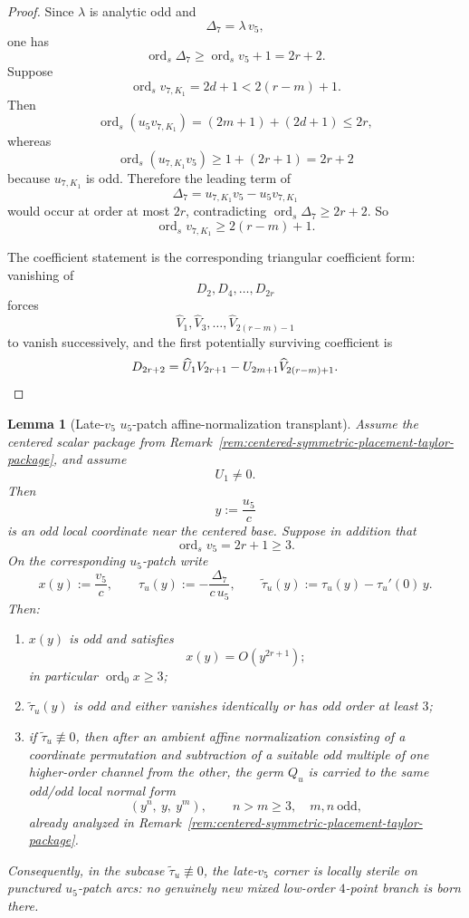 \documentclass[11pt,a4paper]{amsart}
\theoremstyle{plain}
\newtheorem{lemma}[theorem]{Lemma}
\theoremstyle{definition}
\begin{document}
\begin{proof}
Since $\lambda$ is analytic odd and
\[
\Delta_7=\lambda\,v_5,
\]
one has
\[
\operatorname{ord}_s\Delta_7\ge \operatorname{ord}_s v_5+1=2r+2.
\]
Suppose
\[
\operatorname{ord}_s v_{7,K_1}=2d+1<2(r-m)+1.
\]
Then
\[
\operatorname{ord}_s(u_5v_{7,K_1})=(2m+1)+(2d+1)\le 2r,
\]
whereas
\[
\operatorname{ord}_s(u_{7,K_1}v_5)\ge 1+(2r+1)=2r+2
\]
because $u_{7,K_1}$ is odd. Therefore the leading term of
\[
\Delta_7=u_{7,K_1}v_5-u_5v_{7,K_1}
\]
would occur at order at most $2r$, contradicting $\operatorname{ord}_s\Delta_7\ge 2r+2$.
So
\[
\operatorname{ord}_s v_{7,K_1}\ge 2(r-m)+1.
\]

The coefficient statement is the corresponding triangular coefficient form:
vanishing of
\[
D_2,D_4,\dots,D_{2r}
\]
forces
\[
\widehat V_1,\widehat V_3,\dots,\widehat V_{2(r-m)-1}
\]
to vanish successively, and the first potentially surviving coefficient is
\[
D_{2r+2}=\widehat U_1V_{2r+1}-U_{2m+1}\widehat V_{2(r-m)+1}.
\qedhere
\]
\end{proof}

\begin{lemma}[Late-$v_5$ $u_5$-patch affine-normalization transplant]
\label{lem:late-v5-u5-patch-transplant}
Assume the centered scalar package from
Remark~\ref{rem:centered-symmetric-placement-taylor-package}, and assume
\[
U_1\neq 0.
\]
Then
\[
y:=\frac{u_5}{c}
\]
is an odd local coordinate near the centered base. Suppose in addition that
\[
\operatorname{ord}_s v_5=2r+1\ge 3.
\]
On the corresponding $u_5$-patch write
\[
x(y):=\frac{v_5}{c},
\qquad
\tau_u(y):=-\frac{\Delta_7}{c\,u_5},
\qquad
\widetilde\tau_u(y):=\tau_u(y)-\tau_u'(0)\,y.
\]
Then:
\begin{enumerate}
\item $x(y)$ is odd and satisfies
\[
x(y)=O(y^{2r+1});
\]
in particular $\operatorname{ord}_0 x\ge 3$;
\item $\widetilde\tau_u(y)$ is odd and either vanishes identically or has odd
order at least $3$;
\item if $\widetilde\tau_u\not\equiv 0$, then after an ambient affine
normalization consisting of a coordinate permutation and subtraction of a
suitable odd multiple of one higher-order channel from the other, the germ
$Q_u$ is carried to the same odd/odd local normal form
\[
(y^n,\ y,\ y^m),
\qquad
n>m\ge 3,\quad m,n\ \text{odd},
\]
already analyzed in
Remark~\ref{rem:centered-symmetric-placement-taylor-package}.
\end{enumerate}
Consequently, in the subcase $\widetilde\tau_u\not\equiv 0$, the late-$v_5$
corner is locally sterile on punctured $u_5$-patch arcs: no genuinely new
mixed low-order $4$-point branch is born there.
\end{lemma}
\end{document}
